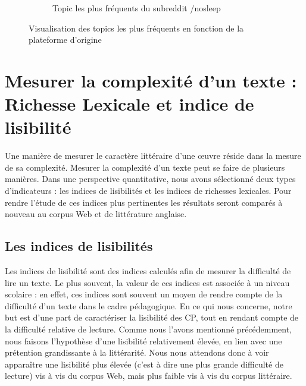 \documentclass[12pt,a4paper,oneside,titlepage]{book} %
\begin{document}
\begin{figure}[htbp]
\begin{subfigure}[b]{0.45\textwidth}
				\caption{Topic les plus fréquents du subreddit /nosleep}
				\label{fig:topic_reddit}
			\end{subfigure}
			\caption{Visualisation des topics les plus fréquents en fonction de la plateforme d'origine}
			\label{fig:topics_plateforme}
		\end{figure}
		

	\section{Mesurer la complexité d'un texte : Richesse Lexicale et indice de lisibilité}
	
	Une manière de mesurer le caractère littéraire d'une œuvre réside dans la mesure de sa complexité. Mesurer la complexité d'un texte peut se faire de plusieurs manières. Dans une perspective quantitative, nous avons sélectionné deux types d'indicateurs : les indices de lisibilités et les indices de richesses lexicales. 
	Pour rendre l'étude de ces indices plus pertinentes les résultats seront comparés à nouveau au corpus Web et de littérature anglaise.


	\subsection{Les indices de lisibilités} 
	Les indices de lisibilité sont des indices calculés afin de mesurer la difficulté de lire un texte. Le plus souvent, la valeur de ces indices est associée à un niveau scolaire : en effet, ces indices sont souvent un moyen de rendre compte de la difficulté d'un texte dans le cadre pédagogique.
	En ce qui nous concerne, notre but est d'une part de caractériser la lisibilité des CP, tout en rendant compte de la difficulté relative de lecture. Comme nous l'avons mentionné précédemment, nous faisons l'hypothèse d'une lisibilité relativement élevée, en lien avec une prétention grandissante à la littérarité. Nous nous attendons donc à voir apparaître une lisibilité plus élevée (c'est à dire une plus grande difficulté de lecture) vis à vis du corpus Web, mais plus faible vis à vis du corpus littéraire.
	
\end{document}
